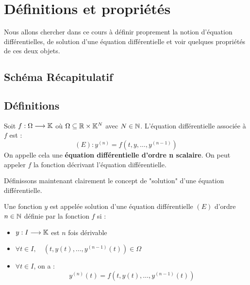 \minitoc  %


\section{Définitions et propriétés}

Nous allons chercher dans ce cours à définir proprement la notion d'équation différentielles, 
de solution d'une équation différentielle et voir quelques propriétés de ces deux objets. 

\subsection{Schéma Récapitulatif}


\subsection{Définitions}

\begin{definition}
    Soit $f : \Omega \longrightarrow \mathbb{K}$ où $ \Omega \subseteq \mathbb{R} \times \mathbb{K}^N$ avec $N \in \mathbb{N}$. 
    L'équation différentielle associée à $f$ est :
        \[ (E) : y^{(n)} = f(t,y,\dots,y^{(n-1)}) \] 
    On appelle cela une \textbf{équation différentielle d'ordre n scalaire}. 
    On peut appeler $f$ la fonction décrivant l'équation différentielle. 
\end{definition}

Définissons maintenant clairement le concept de "solution" d'une équation différentielle. 

\begin{definition}[Solution]
    Une fonction $y$ est appelée solution d'une équation différentielle $(E)$ d'ordre $n \in \mathbb{N}$ 
    définie par la fonction $f$ si :
    \begin{itemize}
        \item $y : I \longrightarrow \mathbb{K}$ est $n$ fois dérivable 
        \item $ \forall t \in I, \quad (t,y(t), \dots, y^{(n-1)}(t)) \in \Omega $ 
        \item $ \forall t \in I$, on a : 
            \[ \boxed{ y^{(n)}(t) = f(t,y(t), \dots, y^{(n-1)}(t)) } \] 
    \end{itemize}
\end{definition}

